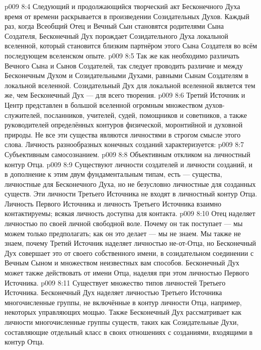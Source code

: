 \vs p009 8:4 Следующий и продолжающийся творческий акт Бесконечного Духа время от времени раскрывается в произведении Созидательных Духов. Каждый раз, когда Всеобщий Отец и Вечный Сын становятся родителями Сына Создателя, Бесконечный Дух порождает Созидательного Духа локальной вселенной, который становится близким партнёром этого Сына Создателя во всём последующем вселенском опыте.
\vs p009 8:5 Так же как необходимо различать Вечного Сына и Сынов Создателей, так следует проводить различие и между Бесконечным Духом и Созидательными Духами, равными Сынам Создателям в локальной вселенной. Созидательный Дух для локальной вселенной является тем же, чем Бесконечный Дух --- для всего творения.
\vs p009 8:6 \pc Третий Источник и Центр представлен в большой вселенной огромным множеством духов\hyp{}служителей, посланников, учителей, судей, помощников и советников, а также руководителей определённых контуров физической, моронтийной и духовной природы. Не все эти существа являются личностями в строгом смысле этого слова. Личность разнообразных конечных созданий характеризуется:
\vs p009 8:7 Субъективным самосознанием.
\vs p009 8:8 Объективным откликом на личностный контур Отца.
\vs p009 8:9 \pc Существуют личности создателей и личности созданий, и в дополнение к этим двум фундаментальным типам, есть  --- существа, личностные для Бесконечного Духа, но не безусловно личностные для созданных существ. Эти личности Третьего Источника не входят в личностный контур Отца. Личность Первого Источника и личность Третьего Источника взаимно контактируемы; всякая личность доступна для контакта.
\vs p009 8:10 \pc Отец наделяет личностью по своей личной свободной воле. Почему он так поступает --- мы можем только предполагать; как он это делает --- мы не знаем. Мы также не знаем, почему Третий Источник наделяет личностью не\hyp{}от\hyp{}Отца, но Бесконечный Дух совершает это от своего собственного имени, в созидательном соединении с Вечным Сыном и множеством неизвестных вам способов. Бесконечный Дух может также действовать от имени Отца, наделяя при этом личностью Первого Источника.
\vs p009 8:11 \pc Существует множество типов личностей Третьего Источника. Бесконечный Дух наделяет личностью Третьего Источника многочисленные группы, не включённые в контур личности Отца, например, некоторых управляющих мощью. Также Бесконечный Дух рассматривает как личности многочисленные группы существ, таких как Созидательные Духи, составляющие отдельный класс в своих отношениях с созданиями, входящими в контур Отца.
